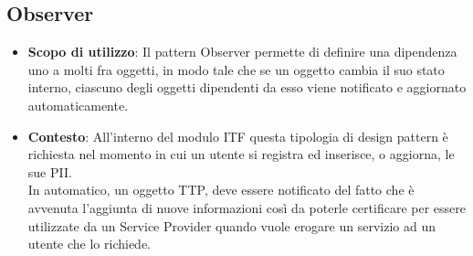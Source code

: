 \subsection{Observer}
\begin{itemize}
	\item \textbf{Scopo di utilizzo}: Il pattern Observer permette di definire una dipendenza uno a molti fra oggetti, in modo tale che se un oggetto cambia il suo stato interno, ciascuno degli oggetti dipendenti da esso viene notificato e aggiornato automaticamente.
	\item \textbf{Contesto}: All'interno del modulo \gls{ITF} questa tipologia di design pattern è richiesta nel momento in cui un utente si registra ed inserisce, o aggiorna, le sue \gls{PII}.\\
	In automatico, un oggetto \gls{TTP}, deve essere notificato del fatto che è avvenuta l'aggiunta di nuove informazioni così da poterle certificare per essere utilizzate da un Service Provider quando vuole erogare un servizio ad un utente che lo richiede.
\end{itemize}